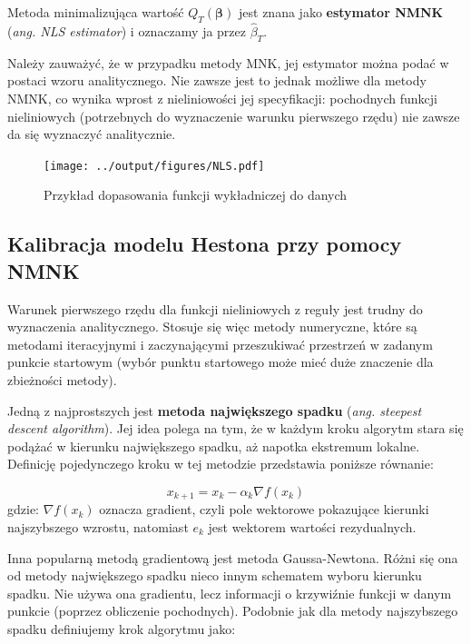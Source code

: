\documentclass{pracamgr}
\begin{document}
Metoda minimalizująca wartość $Q_T(\mathbf{\beta})$ jest znana 
jako \textbf{estymator NMNK} (\textit{ang. NLS estimator}) i oznaczamy ja przez $\hat{\beta}_T$.

Należy zauważyć, że w przypadku metody MNK, jej estymator można podać w postaci wzoru
analitycznego. Nie zawsze jest to jednak możliwe dla metody NMNK, co wynika wprost z nieliniowości 
jej specyfikacji: pochodnych funkcji nieliniowych (potrzebnych do wyznaczenie warunku pierwszego rzędu) 
nie zawsze da się wyznaczyć analitycznie.


\begin{figure}
  \centering
  \texttt{[image: ../output/figures/NLS.pdf]}
  \caption{Przykład dopasowania funkcji wykładniczej do danych}
  \label{fig:volatilitySurface}
\end{figure}




\subsection{Kalibracja modelu Hestona przy pomocy NMNK}

Warunek pierwszego rzędu dla funkcji nieliniowych z reguły
jest trudny do wyznaczenia analitycznego. Stosuje się więc metody numeryczne, które są metodami 
iteracyjnymi i zaczynającymi przeszukiwać przestrzeń w zadanym punkcie startowym (wybór punktu 
startowego może mieć duże znaczenie dla zbieżności metody).

Jedną z najprostszych jest \textbf{metoda największego spadku} 
(\textit{ang. steepest descent algorithm}). Jej idea polega na tym, że w 
każdym kroku algorytm stara się podążać w kierunku największego spadku, aż 
napotka ekstremum lokalne. Definicję pojedynczego kroku w tej metodzie 
przedstawia poniższe równanie:


\begin{equation}
  x_{k+1} = x_k - \alpha_k \nabla f(x_k)
\end{equation}
gdzie: $\nabla f(x_k)$ oznacza gradient, czyli pole wektorowe pokazujące kierunki najszybszego 
wzrostu, natomiast $e_k$ jest wektorem wartości rezydualnych.


Inna popularną metodą gradientową jest metoda Gaussa-Newtona. Różni się ona od metody największego 
spadku nieco innym schematem wyboru kierunku spadku. Nie używa ona gradientu, 
lecz informacji o krzywiźnie funkcji w danym punkcie (poprzez obliczenie pochodnych).
Podobnie jak dla metody najszybszego spadku definiujemy krok algorytmu jako:
\end{document}
